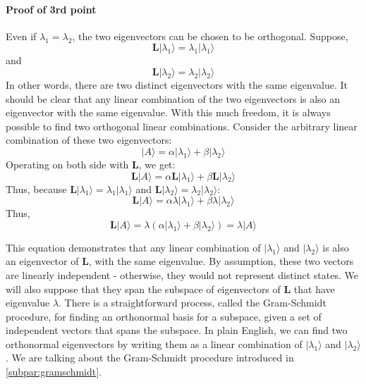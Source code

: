 \documentclass[a4paper,10pt]{article}
\begin{document}
\paragraph{Proof of 3rd point} Even if $\lambda_1 = \lambda_2$, the two eigenvectors can be chosen to be orthogonal. Suppose,
$$\mathbf{L}|\lambda_1\rangle = \lambda_1|\lambda_1\rangle$$
and
$$\mathbf{L}|\lambda_2\rangle = \lambda_2|\lambda_2\rangle$$
In other words, there are two distinct eigenvectors with the same eigenvalue. It should be clear that any linear combination of the two eigenvectors is also an eigenvector with the same eigenvalue. With this much freedom, it is always possible to find two orthogonal linear combinations. Consider the arbitrary linear combination of these two eigenvectors:
$$|A\rangle = \alpha|\lambda_1\rangle + \beta|\lambda_2\rangle$$
Operating on both side with $\mathbf{L}$, we get:
$$\mathbf{L}|A\rangle = \alpha\mathbf{L}|\lambda_1\rangle + \beta\mathbf{L}|\lambda_2\rangle$$
Thus, because $\mathbf{L}|\lambda_1\rangle = \lambda_1|\lambda_1\rangle$ and $\mathbf{L}|\lambda_2\rangle = \lambda_2|\lambda_2\rangle$:
$$\mathbf{L}|A\rangle = \alpha\lambda|\lambda_1\rangle + \beta\lambda|\lambda_2\rangle$$
Thus, 
$$\mathbf{L}|A\rangle = \lambda(\alpha|\lambda_1\rangle + \beta|\lambda_2\rangle) = \lambda|A\rangle$$

This equation demonstrates that any linear combination of $|\lambda_1\rangle$ and $|\lambda_2\rangle$ is also an eigenvector of $\mathbf{L}$, with the same eigenvalue. By assumption, these two vectors are linearly independent - otherwise, they would not represent distinct states. We will also suppose that they span the subspace of eigenvectors of $\mathbf{L}$ that have eigenvalue $\lambda$. There is a straightforward process, called the Gram-Schmidt procedure, for finding an orthonormal basis for a subspace, given a set of independent vectors that spans the subspace. In plain English, we can find two orthonormal eigenvectors by writing them as a linear combination of $|\lambda_1\rangle$ and $|\lambda_2\rangle$. We are talking about the Gram-Schmidt procedure introduced in \autoref{subpar:gramschmidt}.

\end{document}
